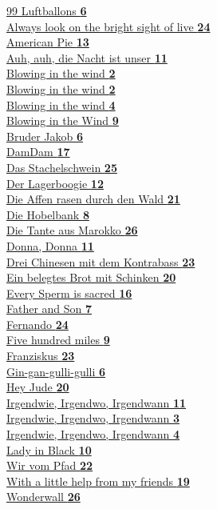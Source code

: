 \toctitle{\faHashtag} 
\hyperlink{page.6}{99 Luftballons \textbf {6}} \\ 
\hyperlink{page.24}{Always look on the bright sight of live \textbf {24}} \\ 
\hyperlink{page.13}{American Pie \textbf {13}} \\ 
\hyperlink{page.11}{Auh, auh, die Nacht ist unser \textbf {11}} \\ 
\hyperlink{page.2}{Blowing in the wind \textbf {2}} \\ 
\hyperlink{page.2}{Blowing in the wind \textbf {2}} \\ 
\hyperlink{page.4}{Blowing in the wind \textbf {4}} \\ 
\hyperlink{page.9}{Blowing in the Wind \textbf {9}} \\ 
\hyperlink{page.6}{Bruder Jakob \textbf {6}} \\ 
\hyperlink{page.17}{DamDam \textbf {17}} \\ 
\hyperlink{page.25}{Das Stachelschwein \textbf {25}} \\ 
\hyperlink{page.12}{Der Lagerboogie \textbf {12}} \\ 
\hyperlink{page.21}{Die Affen rasen durch den Wald \textbf {21}} \\ 
\hyperlink{page.8}{Die Hobelbank \textbf {8}} \\ 
\hyperlink{page.26}{Die Tante aus Marokko \textbf {26}} \\ 
\hyperlink{page.11}{Donna, Donna \textbf {11}} \\ 
\hyperlink{page.23}{Drei Chinesen mit dem Kontrabass \textbf {23}} \\ 
\hyperlink{page.20}{Ein belegtes Brot mit Schinken \textbf {20}} \\ 
\hyperlink{page.16}{Every Sperm is sacred \textbf {16}} \\ 
\hyperlink{page.7}{Father and Son \textbf {7}} \\ 
\hyperlink{page.24}{Fernando \textbf {24}} \\ 
\hyperlink{page.9}{Five hundred miles \textbf {9}} \\ 
\hyperlink{page.23}{Franziskus \textbf {23}} \\ 
\hyperlink{page.6}{Gin-gan-gulli-gulli \textbf {6}} \\ 
\hyperlink{page.20}{Hey Jude \textbf {20}} \\ 
\hyperlink{page.11}{Irgendwie, Irgendwo, Irgendwann \textbf {11}} \\ 
\hyperlink{page.3}{Irgendwie, Irgendwo, Irgendwann \textbf {3}} \\ 
\hyperlink{page.4}{Irgendwie, Irgendwo, Irgendwann \textbf {4}} \\ 
\hyperlink{page.10}{Lady in Black \textbf {10}} \\ 
\hyperlink{page.22}{Wir vom Pfad \textbf {22}} \\ 
\hyperlink{page.19}{With a little help from my friends \textbf {19}} \\ 
\hyperlink{page.26}{Wonderwall \textbf {26}} \\ 
